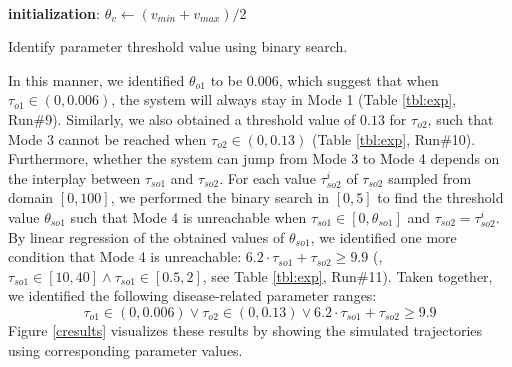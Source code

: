 \begin{algorithm}
\SetAlFnt{\tiny}
\SetAlCapFnt{\small}
\SetAlCapNameFnt{\small}
\SetAlgoLined
{}
\\
\textbf{initialization}: $\theta_{v} \leftarrow (v_{min}+v_{max})/2$\;
\caption{Identify parameter threshold value using binary search. \label{bs}}
\end{algorithm}



In this manner, we identified $\theta_{o1}$ to be $0.006$, which suggest that when $\tau_{o1} \in (0, 0.006)$, the system will always stay in Mode 1 (Table \ref{tbl:exp}, Run\#9). Similarly, we also obtained a threshold value of $0.13$ for $\tau_{o2}$, such that Mode 3 cannot be reached when $\tau_{o2} \in (0, 0.13)$ (Table \ref{tbl:exp}, Run\#10). Furthermore, whether the system can jump from Mode 3 to Mode 4 depends on the interplay between $\tau_{so1}$ and $\tau_{so2}$.  For each value $\tau_{so2}^i$ of $\tau_{so2}$ sampled from domain $[0, 100]$, we performed the binary search in $[0, 5]$ to find the threshold value $\theta_{so1}$ such that Mode 4 is unreachable when $\tau_{so1} \in [0,\theta_{so1}]$ and $\tau_{so2} = {\tau_{so2}^i}$. By linear regression of the obtained values of $\theta_{so1}$, we identified one more condition that Mode 4 is unreachable:  $6.2 \cdot \tau_{so1} + \tau_{so2} \ge 9.9$ (\eg,  $\tau_{so1} \in [10, 40] \wedge \tau_{so1}\in [0.5, 2]$, see Table \ref{tbl:exp}, Run\#11). Taken together, we identified the following disease-related parameter ranges:
$$\tau_{o1} \in (0,0.006)\vee \tau_{o2} \in (0,0.13)\vee 6.2 \cdot \tau_{so1} + \tau_{so2} \ge 9.9$$
Figure \ref{cresults} visualizes these results by showing the simulated trajectories using corresponding parameter values.



